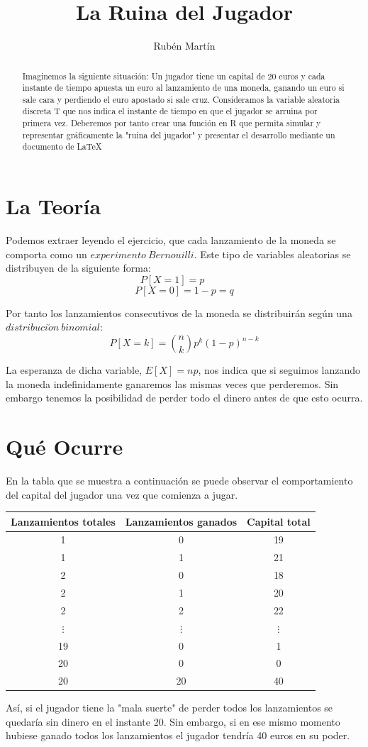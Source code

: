 \documentclass[10pt,a4paper]{article}
\author{Rubén Martín}
\title{La Ruina del Jugador}
\date{}
\begin{document}
\maketitle

\begin{abstract}
Imaginemos la siguiente situación: Un jugador tiene un capital de 20 euros y cada instante de tiempo apuesta un euro al lanzamiento de una moneda, ganando un euro si sale cara y perdiendo el euro apostado si sale cruz. Consideramos la variable aleatoria discreta T que nos indica el instante de tiempo en que el jugador se arruina por primera vez. Deberemos por tanto crear una función en R que permita simular y representar gráficamente la "ruina del jugador" y presentar el desarrollo mediante un documento de LaTeX\cite{LaTeX}
\end{abstract}

\tableofcontents

\newpage
\section{La Teoría}
Podemos extraer leyendo el ejercicio, que cada lanzamiento de la moneda se comporta como un $experimento\ Bernouilli$. Este tipo de variables aleatorias\cite{prob} se distribuyen de la siguiente forma:
$$P[X=1]=p\ \ \ \ \ \ \ \ \ \ \ $$
$$P[X=0]=1-p=q$$

Por tanto los lanzamientos consecutivos de la moneda se distribuirán según una $distribuci\acute{o}n\ binomial$:
$$P[X=k]=\binom{n}{k} p^k(1-p)^{n-k}$$

La esperanza de dicha variable, $E[X]=np$, nos indica que si seguimos lanzando la moneda indefinidamente ganaremos  las mismas veces que perderemos. Sin embargo tenemos la posibilidad de perder todo el dinero antes de que esto ocurra.
\newpage
\section{Qué Ocurre}
En la tabla que se muestra a continuación se puede observar el comportamiento del capital del jugador una vez que comienza a jugar.

\begin{center}
\begin{tabular}[t]{c c c}
Lanzamientos totales & Lanzamientos ganados & Capital total\\
\hline
1 & 0 & 19\\
1 & 1 & 21\\
2 & 0 & 18\\
2 & 1 & 20\\
2 & 2 & 22\\
$\vdots$ & $\vdots$ & $\vdots$\\
19 & 0 & 1\\
20 & 0 & 0\\
20 & 20 & 40\\
\end{tabular}
\end{center}
Así, si el jugador tiene la "mala suerte" de perder todos los lanzamientos se quedaría sin dinero en el instante 20. Sin embargo, si en ese mismo momento hubiese ganado todos los lanzamientos el jugador tendría 40 euros en su poder.
\newpage
\end{document}
